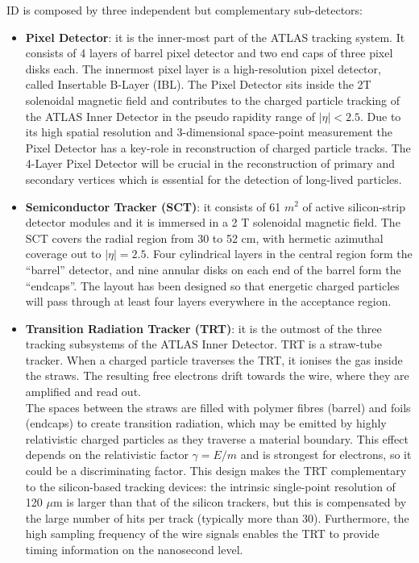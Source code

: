 \documentclass[a4paper, oneside]{book}
\begin{document}
					ID is composed by three independent but complementary sub-detectors: 
					\begin{itemize}
						\item  \textbf{Pixel Detector}:  \cite{Inner Detector}
						it is  the  inner-most  part  of  the  ATLAS  tracking  system. It consists of 4 layers of barrel pixel detector and two end caps of three pixel disks each. The innermost pixel layer is a high-resolution pixel detector,  called Insertable B-Layer (IBL). The Pixel Detector sits inside the 2T solenoidal magnetic field and contributes to the charged particle tracking of the ATLAS Inner Detector in the pseudo rapidity range of $|\eta|<2.5$. Due to its high spatial resolution and 3-dimensional space-point measurement the Pixel Detector has a key-role in reconstruction of charged particle tracks.  The 4-Layer Pixel Detector will be crucial in the reconstruction of primary and secondary vertices which is essential for the detection of long-lived particles.	
						\item \textbf{Semiconductor Tracker (SCT)}: \cite{SCT}
						it consists of 61 $m^2$ of active silicon-strip detector modules and it is immersed in a 2 T solenoidal magnetic field. The  SCT  covers  the  radial  region  from  30  to  52  cm,  with  hermetic  azimuthal  coverage  out  to $|\eta|=2.5$. Four cylindrical layers in the central region form the “barrel” detector, and nine annular disks on each end of the barrel form the “endcaps”. The layout has been designed so that energetic charged particles will pass through at least four layers everywhere in the acceptance region.
						\item \textbf{Transition Radiation Tracker (TRT)}: \cite{TRT}
						it is the outmost of the three tracking subsystems of the ATLAS Inner Detector. TRT is a straw-tube tracker. When a charged particle traverses the TRT, it ionises the gas inside the straws. The resulting free electrons drift towards the wire, where they are amplified and read out.\\
						The spaces between the straws are filled with polymer fibres (barrel) and foils (endcaps) to create transition radiation, which may be emitted by highly relativistic charged particles as they traverse a material boundary.   This effect depends on the relativistic factor $\gamma=E/m$ and is strongest for electrons, so it could be a discriminating factor.
						This design  makes the TRT complementary to  the silicon-based tracking devices:  the intrinsic single-point resolution of 120 $\mu$m is larger than that of the silicon trackers, but this is compensated by the large number of hits per track (typically more than 30).  Furthermore, the high sampling frequency of the wire signals enables the TRT to provide timing information on the nanosecond level.
					\end{itemize}
\end{document}
